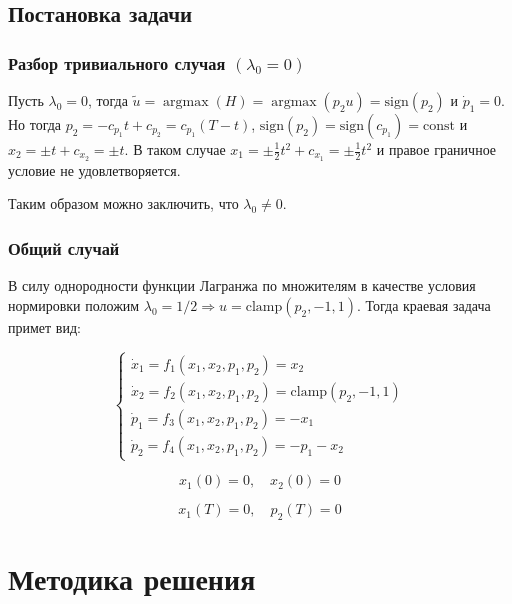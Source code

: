 \documentclass[a4paper,12pt]{article}
\DeclareMathOperator*{\argmax}{argmax}
\begin{document}
\subsection{Постановка задачи}

\subsubsection{\texorpdfstring{Разбор тривиального случая
    \((\lambda_0=0)\)}{Разбор тривиального случая (\textbackslash lambda\_0=0)}}

Пусть \(\lambda_0=0\), тогда
\(\tilde{u}=\argmax(H)=\argmax\left(p_2u\right) = \text{sign}(p_2)\) и
\(\dot{p}_1=0\).
Но тогда \(p_2=-c_{p_1} t+c_{p_2}=c_{p_1} (T - t)\),
\(\text{sign}(p_2)=\text{sign}(c_{p_1})=\text{const}\) и
\(x_2=\pm t + c_{x_2}=\pm t\). В таком случае
\(x_1=\pm \frac{1}{2} t^2+c_{x_1}=\pm \frac{1}{2} t^2\) и правое
граничное условие не удовлетворяется.

Таким образом можно заключить, что \(\lambda_0 \neq 0\).

\subsubsection{Общий случай}

В силу однородности функции Лагранжа по множителям в качестве условия
нормировки положим
\(\lambda_0=1/2 \Rightarrow u=\text{clamp}(p_2,-1,1)\). Тогда краевая
задача примет вид:

\begin{equation}
  \label{system}
  \begin{cases}
    \dot{x}_1=f_1(x_1,x_2,p_1,p_2)=x_2                    \\
    \dot{x}_2=f_2(x_1,x_2,p_1,p_2)=\text{clamp}(p_2,-1,1) \\
    \dot{p}_1=f_3(x_1,x_2,p_1,p_2)=-x_1                   \\
    \dot{p}_2=f_4(x_1,x_2,p_1,p_2)=-p_1-x_2
  \end{cases}
\end{equation}

\begin{equation}
  \label{left_cond}
  x_1(0)=0, \quad x_2(0)=0
\end{equation}

\begin{equation}
  \label{right_cond}
  x_1(T)=0, \quad p_2(T)=0
\end{equation}

\section{Методика решения}
\end{document}
